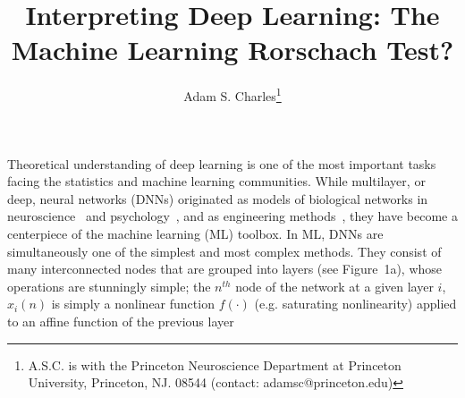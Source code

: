 \documentclass[11pt,lettersize]{article}
\begin{document}
\title{Interpreting Deep Learning: The Machine Learning Rorschach Test?}
\date{}
\author{Adam S. Charles\footnote{A.S.C. is with the Princeton Neuroscience Department at Princeton University, Princeton, NJ. 08544 (contact: adamsc@princeton.edu)}}
\maketitle


Theoretical understanding of deep learning is one of the most important tasks facing the statistics and machine learning communities. 
While multilayer, or deep, neural networks (DNNs) originated as models of biological networks in neuroscience~\cite{mcculloch1943logical,hopfield1982neural,hopfield1985neural,grossberg1988nonlinear} and psychology~\cite{levine1983neural,rumelhart1987parallel}, and as engineering methods~\cite{pham1970neural,ersu1984application}, they have become a centerpiece of the machine learning (ML) toolbox.
In ML, DNNs are simultaneously one of the simplest and most complex methods. They consist of many interconnected nodes that are grouped into layers (see Figure~1a), whose operations are stunningly simple; the $n^{th}$ node of the network at a given layer $i$, $x_i(n)$ is simply a nonlinear function $f(\cdot)$ (e.g. saturating nonlinearity) applied to an affine function of the previous layer 
\end{document}

